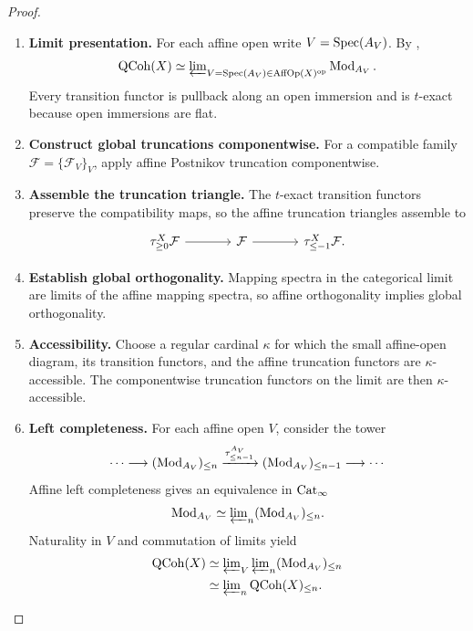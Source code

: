 \begin{proof}
\leavevmode
\begin{enumerate}[label=\textup{(\arabic*)}]
    \item \textbf{Limit presentation.}
    For each affine open write \(V=\operatorname{Spec}(A_V)\). By
    ,
    \[
        \operatorname{QCoh}(X)
        \simeq
        \varprojlim\nolimits_{V=\operatorname{Spec}(A_V)\in\operatorname{AffOp}(X)^{\mathrm{op}}}
        \operatorname{Mod}_{A_V}.
    \]
    Every transition functor is pullback along an open immersion and is
    \(t\)-exact because open immersions are flat.

    \item \textbf{Construct global truncations componentwise.}
    For a compatible family \(\mathcal F=\{\mathcal F_V\}_V\), apply affine
    Postnikov truncation componentwise.

    \item \textbf{Assemble the truncation triangle.}
    The \(t\)-exact transition functors
    preserve the compatibility maps, so the affine truncation triangles
    assemble to
    \[
    \begin{tikzcd}[column sep=large]
        \tau_{\geq0}^{X}\mathcal F
            \arrow[r]
        &
        \mathcal F
            \arrow[r]
        &
        \tau_{\leq-1}^{X}\mathcal F.
    \end{tikzcd}
    \]

    \item \textbf{Establish global orthogonality.}
    Mapping spectra in the categorical limit are limits of the affine mapping
    spectra, so affine orthogonality implies global orthogonality.

    \item \textbf{Accessibility.}
    Choose a regular cardinal \(\kappa\) for which the small affine-open
    diagram, its transition functors, and the affine truncation functors are
    \(\kappa\)-accessible. The componentwise truncation functors on the limit
    are then \(\kappa\)-accessible.

    \item \textbf{Left completeness.}
    For each affine open \(V\), consider the tower
    \[
        \cdots
        \longrightarrow
        (\operatorname{Mod}_{A_V})_{\leq n}
        \xrightarrow{\tau_{\leq n-1}^{A_V}}
        (\operatorname{Mod}_{A_V})_{\leq n-1}
        \longrightarrow\cdots
    \]
    Affine left completeness gives an equivalence in \(\operatorname{Cat}_\infty\)
    \[
        \operatorname{Mod}_{A_V}
        \simeq
        \varprojlim\nolimits_n
        (\operatorname{Mod}_{A_V})_{\leq n}.
    \]
    Naturality in \(V\) and commutation of limits yield
    \[
    \begin{aligned}
        \operatorname{QCoh}(X)
        &\simeq
        \varprojlim\nolimits_V\varprojlim\nolimits_n
        (\operatorname{Mod}_{A_V})_{\leq n}
        \\
        &\simeq
        \varprojlim\nolimits_n\operatorname{QCoh}(X)_{\leq n}.
    \end{aligned}
    \]


\end{enumerate}
\end{proof}
